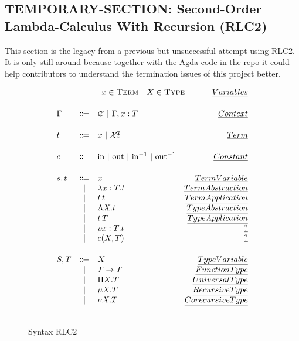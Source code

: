 \subsection{TEMPORARY-SECTION: Second-Order Lambda-Calculus With Recursion (RLC2)}

This section is the legacy from a previous but unsuccessful attempt using RLC2.
It is only still around because together with the Agda code in the repo it could help contributors to understand the termination issues of this project better.

\begin{figure}[H]
    \setlength{\abovedisplayskip}{0pt}
    \setlength{\belowdisplayskip}{0pt}
    \setlength{\abovedisplayshortskip}{0pt}
    \setlength{\belowdisplayshortskip}{0pt}
  \[
  \begin{array}{lclr}
    \multicolumn{4}{r}{
      x \in \textsc{Term}
      \quad
      X \in \textsc{Type}
      \mspace{60mu}
      \emph{Variables}
    }
    \\[0.5cm]

    \Gamma
    & \Coloneqq
    & \varnothing\ |\ \Gamma, x : T
    & \emph{Context}
    \\[0.5cm]

    t
    & \Coloneqq
    & x\ |\ \mathcal{X}\overline{t}
    & \emph{Term}
    \\[0.5cm]

    c
    & \Coloneqq
    & \text{in}\ |\ \text{out}\ |\ \text{in$^{-1}$}\ |\ \text{out$^{-1}$}
    & \emph{Constant}
    \\[0.5cm]

    s,t
    & \Coloneqq
    & x
    & \emph{Term Variable}
    \\
    & | & \lambda x : T.t
    & \emph{Term Abstraction}
    \\
    & | & t \, t
    & \emph{Term Application}
    \\
    & | & \Lambda X.t
    & \emph{Type Abstraction}
    \\
    & | & t \, T
    & \emph{Type Application}
    \\
    & | & \rho x : T.t
    & \emph{?}
    \\
    & | & c(X,T)
    & \emph{?}
    \\[0.5cm]

    S,T
    & \Coloneqq
    & X
    & \emph{Type Variable}
    \\
    & | & T \to T
    & \emph{Function Type}
    \\
    & | & \Pi X.T
    & \emph{Universal Type}
    \\
    & | & \mu X.T
    & \emph{Recursive Type}
    \\
    & | & \nu X.T
    & \emph{Corecursive Type}
    \\[0.5cm]
  \end{array}
  \]
  \caption{Syntax RLC2}
  \label{fig:RLC2:syntax}
\end{figure}

